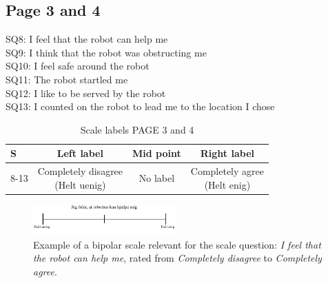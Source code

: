 \subsection{Page 3 and 4}
\noindent
SQ8: I feel that the robot can help me\\%
SQ9: I think that the robot was obstructing me\\%
SQ10: I feel safe around the robot\\%
SQ11: The robot startled me\\ %
SQ12: I like to be served by the robot\\%
SQ13: I counted on the robot to lead me to the location I chose\\%
%
\begin{table}[H]
	\centering
\caption{Scale labels PAGE 3 and 4}
	\label{tab:ScalesPage3} 
	\begin{tabular}{l|c|c|c}
		S     & Left label & Mid point & Right label \\\hline
		8-13   & \makecell{Completely disagree\\(Helt uenig)}  & No label & \makecell{Completely agree\\(Helt enig)}                      
	\end{tabular}        
\end{table}
\noindent
%
\begin{figure}[H]
\centering
\includegraphics[width = 0.49\textwidth]{Figure/TilpassetRobottenKanHjaelpe}
\setlength{} 
\caption{Example of a bipolar scale relevant for the scale question: \textit{I feel that the robot can help me}, rated from \textit{Completely disagree} to \textit{Completely agree}.}
\label{fig:TilpassetRobottenKanHjaelpe}
\end{figure}
\noindent
% 
